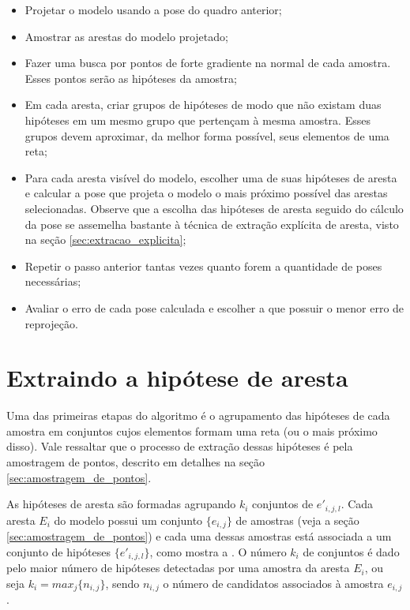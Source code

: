 \begin{itemize}
	\item Projetar o modelo usando a pose do quadro anterior;
	\item Amostrar as arestas do modelo projetado;
	\item Fazer uma busca por pontos de forte gradiente na normal de cada amostra. Esses pontos serão as hipóteses da amostra;
	\item Em cada aresta, criar grupos de hipóteses de modo que não existam duas hipóteses em um mesmo grupo que pertençam à mesma amostra. Esses grupos devem aproximar, da melhor forma possível, seus elementos de uma reta;
	\item Para cada aresta visível do modelo, escolher uma de suas hipóteses de aresta e calcular a pose que projeta o modelo o mais próximo possível das arestas selecionadas. Observe que a escolha das hipóteses de aresta seguido do cálculo da pose se assemelha bastante à técnica de extração explícita de aresta, visto na seção \ref{sec:extracao_explicita};
	\item Repetir o passo anterior tantas vezes quanto forem a quantidade de poses necessárias;
	\item Avaliar o erro de cada pose calculada e escolher a que possuir o menor erro de reprojeção.
\end{itemize}

\section{Extraindo a hipótese de aresta}

Uma das primeiras etapas do algoritmo é o agrupamento das hipóteses de cada amostra em conjuntos cujos elementos formam uma reta (ou o mais próximo disso). Vale ressaltar que o processo de extração dessas hipóteses é pela amostragem de pontos, descrito em detalhes na seção \ref{sec:amostragem_de_pontos}.

As hipóteses de aresta são formadas agrupando $k_i$ conjuntos de $e'_{i,j,l}$. Cada aresta $E_i$ do modelo possui um conjunto $\{e_{i,j}\}$ de amostras (veja a seção \ref{sec:amostragem_de_pontos}) e cada uma dessas amostras está associada a um conjunto de hipóteses $\{e'_{i,j,l}\}$, como mostra a . O número $k_i$ de conjuntos é dado pelo maior número de hipóteses detectadas por uma amostra da aresta $E_i$, ou seja $k_i = max_j\{n_{i,j}\}$, sendo $n_{i,j}$ o número de candidatos associados à amostra $e_{i,j}$.

